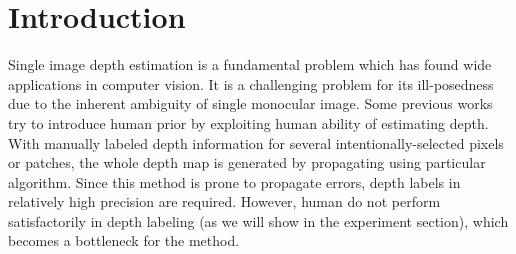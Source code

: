 \documentclass[10pt,twocolumn,letterpaper]{article}
\begin{document}
\section{Introduction}


Single image depth estimation is a fundamental problem which has found wide applications in computer vision. It is a challenging problem for its ill-posedness due to the inherent ambiguity of single monocular image. Some previous works \cite{} try to introduce human prior by exploiting human ability of estimating depth. With manually labeled depth information for several intentionally-selected pixels or patches, the whole depth map is generated by propagating using particular algorithm. Since this method is prone to propagate errors, depth labels in relatively high precision are required. However, human do not perform satisfactorily in depth labeling (as we will show in the experiment section), which becomes a bottleneck for the method.
\end{document}
